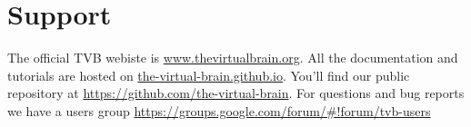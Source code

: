 \documentclass{tufte-handout}
\begin{document}
\section{Support}\label{sec:support}

The official TVB webiste is \url{www.thevirtualbrain.org}.  
All the documentation and tutorials are hosted on \url{the-virtual-brain.github.io}.
You'll find our public  repository at \url{https://github.com/the-virtual-brain}. 
For questions and bug reports we have a users group \url{https://groups.google.com/forum/#!forum/tvb-users}



\end{document}

